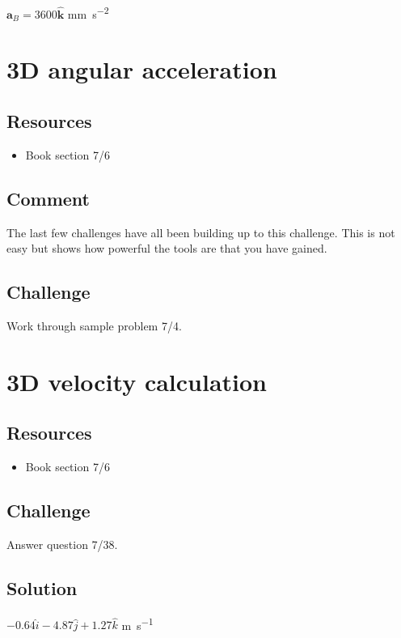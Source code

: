 $\bm{a}_B = 3600 \bm{\hat{k}}$ \si{\mm\per\square\second}




\newpage
\section{3D angular acceleration}

\subsection*{Resources}
\begin{itemize}
    \item Book section 7/6
\end{itemize}

\subsection*{Comment}
The last few challenges have all been building up to this challenge. This is not easy but shows how powerful the tools are that you have gained.

\subsection*{Challenge}
Work through sample problem 7/4.




\newpage
\section{3D velocity calculation}

\subsection*{Resources}
\begin{itemize}
    \item Book section 7/6
\end{itemize}

\subsection*{Challenge}
Answer question 7/38.

\subsection*{Solution}
$-0.64 \hat{i} - 4.87 \hat{j} + 1.27 \hat{k}$ \si{\meter\per\second}




